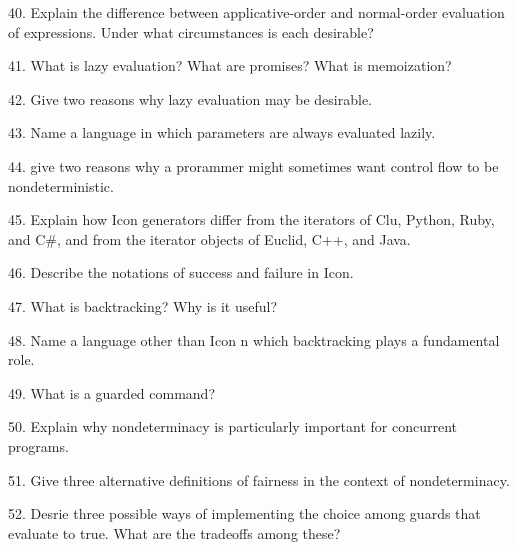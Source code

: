 40. Explain the difference between applicative-order and normal-order evaluation of expressions. Under what circumstances is each desirable?

\filbreak
\vskip 1cm

41. What is lazy evaluation? What are promises? What is memoization?

\filbreak
\vskip 1cm

42. Give two reasons why lazy evaluation may be desirable.

\filbreak
\vskip 1cm

43. Name a language in which parameters are always evaluated lazily.

\filbreak
\vskip 1cm

44. give two reasons why a prorammer might sometimes want control flow to be nondeterministic.

\filbreak
\vskip 1cm

45. Explain how Icon generators differ from the iterators of Clu, Python, Ruby, and C$\#$, and from the iterator objects of Euclid, C++, and Java.

\filbreak
\vskip 1cm

46. Describe the notations of success and failure in Icon.

\filbreak
\vskip 1cm

47. What is backtracking? Why is it useful?

\filbreak
\vskip 1cm

48. Name a language other than Icon n which backtracking plays a fundamental role.

\filbreak
\vskip 1cm

49. What is a guarded command?

\filbreak
\vskip 1cm

50. Explain why nondeterminacy is particularly important for concurrent programs.

\filbreak
\vskip 1cm

51. Give three alternative definitions of fairness in the context of nondeterminacy.

\filbreak
\vskip 1cm

52. Desrie three possible ways of implementing the choice among guards that evaluate to true. What are the tradeoffs among these?

\filbreak
\vfill\eject
\bye
